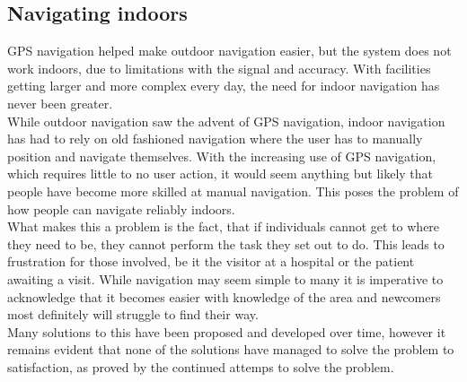 \subsection{Navigating indoors}
GPS navigation helped make outdoor navigation easier, but the system does not work indoors, due to limitations with the signal and accuracy\cite{gps_tech}. With facilities getting larger and more complex every day, the need for indoor navigation has never been greater.\\
While outdoor navigation saw the advent of GPS navigation, indoor navigation has had to rely on old fashioned navigation where the user has to manually position and navigate themselves. With the increasing use of GPS navigation, which requires little to no user action, it would seem anything but likely that people have become more skilled at manual navigation. This poses the problem of how people can navigate reliably indoors.\\
What makes this a problem is the fact, that if individuals cannot get to where they need to be, they cannot perform the task they set out to do. This leads to frustration for those involved, be it the visitor at a hospital or the patient awaiting a visit. While navigation may seem simple to many it is imperative to acknowledge that it becomes easier with knowledge of the area and newcomers most definitely will struggle to find their way.\\
Many solutions to this have been proposed and developed over time, however it remains evident that none of the solutions have managed to solve the problem to satisfaction, as proved by the continued attemps to solve the problem\cite{skejby_attempt}.

